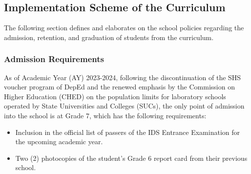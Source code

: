 \subsection{Implementation Scheme of the Curriculum}
The following section defines and elaborates on the school policies regarding the admission, retention, and graduation of students from the curriculum. 

\subsubsection{Admission Requirements}
As of Academic Year (AY) 2023-2024, following the discontinuation of the SHS voucher program of DepEd and the renewed emphasis by the Commission on Higher Education (CHED) on the population limits for laboratory schools operated by State Universities and Colleges (SUCs), the only point of admission into the school is at Grade 7, which has the following requirements:
\begin{itemize}
	\item{Inclusion in the official list of passers of the IDS Entrance Examination for the upcoming academic year.}
	\item{Two (2) photocopies of the student's Grade 6 report card from their previous school.}
\end{itemize}


